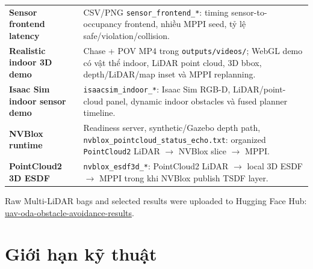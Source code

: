 \documentclass[10pt,a4paper]{article}
\newcommand{\code}[1]{\texttt{#1}}
\begin{document}
\begin{table}[H]
\begin{tabularx}{0.98\linewidth}{>{\bfseries}p{3.8cm} X}
Sensor frontend latency & CSV/PNG \code{sensor\_frontend\_*}: timing sensor-to-occupancy frontend, nhiều MPPI seed, tỷ lệ safe/violation/collision. \\
Realistic indoor 3D demo & Chase + POV MP4 trong \code{outputs/videos/}; WebGL demo có vật thể indoor, LiDAR point cloud, 3D bbox, depth/LiDAR/map inset và MPPI replanning. \\
Isaac Sim indoor sensor demo & \code{isaacsim\_indoor\_*}: Isaac Sim RGB-D, LiDAR/point-cloud panel, dynamic indoor obstacles và fused planner timeline. \\
NVBlox runtime & Readiness server, synthetic/Gazebo depth path, \code{nvblox\_pointcloud\_status\_echo.txt}: organized \code{PointCloud2} LiDAR \(\rightarrow\) NVBlox slice \(\rightarrow\) MPPI. \\
PointCloud2 3D ESDF & \code{nvblox\_esdf3d\_*}: PointCloud2 LiDAR \(\rightarrow\) local 3D ESDF \(\rightarrow\) MPPI trong khi NVBlox publish TSDF layer. \\
\bottomrule
\end{tabularx}
\end{table}

Raw Multi-LiDAR bags and selected results were uploaded to Hugging Face Hub:
\href{https://huggingface.co/datasets/LamTNguyen/uav-oda-obstacle-avoidance-results}{uav-oda-obstacle-avoidance-results}.

\section{Giới hạn kỹ thuật}
\end{document}
